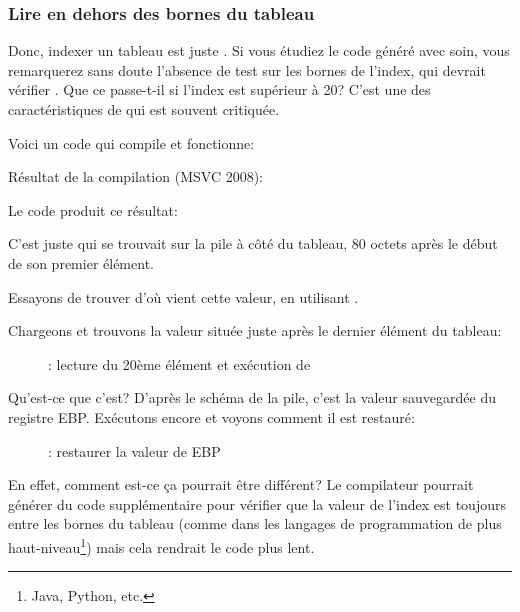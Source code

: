 \subsubsection{Lire en dehors des bornes du tableau}

Donc, indexer un tableau est juste .
Si vous étudiez le code généré avec soin, vous remarquerez sans doute l'absence de
test sur les bornes de l'index, qui devrait vérifier .
Que ce passe-t-il si l'index est supérieur à 20?
C'est une des caractéristiques de \CCpp qui est souvent critiquée.

Voici un code qui compile et fonctionne:



Résultat de la compilation (MSVC 2008):



Le code produit ce résultat:



C'est juste  qui se trouvait sur la pile à côté du tableau, 80 octets
après le début de son premier élément.

\clearpage
\myindex{\olly}
Essayons de trouver d'où vient cette valeur, en utilisant \olly.

Chargeons et trouvons la valeur située juste après le dernier élément du tableau:

\begin{figure}[H]
\centering
{}
\caption{\olly: lecture du 20ème élément et exécution de \printf}
\label{fig:array_BO_olly_r1}
\end{figure}

Qu'est-ce que c'est?
D'après le schéma de la pile, c'est la valeur sauvegardée du registre EBP.
\clearpage
Exécutons encore et voyons comment il est restauré:

\begin{figure}[H]
\centering
{}
\caption{\olly: restaurer la valeur de EBP}
\label{fig:array_BO_olly_r2}
\end{figure}

En effet, comment est-ce ça pourrait être différent?
Le compilateur pourrait générer du code supplémentaire pour vérifier que la valeur
de l'index est toujours entre les bornes du tableau (comme dans les langages de
programmation de plus haut-niveau\footnote{Java, Python, etc.}) mais cela rendrait
le code plus lent.

